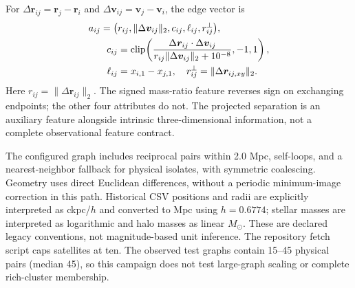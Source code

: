 For $\Delta\bm r_{ij}=\bm r_j-\bm r_i$ and $\Delta\bm v_{ij}=\bm v_j-\bm v_i$, the edge vector is
\begin{equation}
\begin{split}
 a_{ij}=\bigl(&r_{ij},\|\Delta\bm v_{ij}\|_2,c_{ij},\ell_{ij},r^\perp_{ij}\bigr),\\
 c_{ij}&=\operatorname{clip}\!\left(\frac{\Delta\bm r_{ij}\cdot\Delta\bm v_{ij}}
 {r_{ij}\|\Delta\bm v_{ij}\|_2+10^{-8}},-1,1\right),\\
 \ell_{ij}&=x_{i,1}-x_{j,1},\quad
 r^\perp_{ij}=\|\Delta\bm r_{ij,xy}\|_2.
\end{split}
\end{equation}
Here $r_{ij}=\|\Delta\bm r_{ij}\|_2$. The signed mass-ratio feature reverses sign on exchanging endpoints; the other four attributes do not. The projected separation is an auxiliary feature alongside intrinsic three-dimensional information, not a complete observational feature contract.

The configured graph includes reciprocal pairs within 2.0 Mpc, self-loops, and a nearest-neighbor fallback for physical isolates, with symmetric coalescing. Geometry uses direct Euclidean differences, without a periodic minimum-image correction in this path. Historical CSV positions and radii are explicitly interpreted as ckpc/$h$ and converted to Mpc using $h=0.6774$; stellar masses are interpreted as logarithmic and halo masses as linear $M_\odot$. These are declared legacy conventions, not magnitude-based unit inference. The repository fetch script caps satellites at ten. The observed test graphs contain 15--45 physical pairs (median 45), so this campaign does not test large-graph scaling or complete rich-cluster membership.
